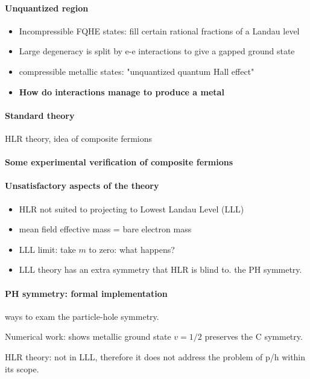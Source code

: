 \documentclass{article}
\numberwithin{equation}{subsection} %
\theoremstyle{definition}
\begin{document}
\paragraph{Unquantized region}

\begin{itemize}
    \item Incompressible FQHE states: fill certain rational fractions of a
        Landau level
    \item Large degeneracy is split by e-e interactions to give a gapped
        ground state
    \item compressible metallic states: "unquantized
        quantum Hall effect"
    \item \textbf{How do interactions manage to produce a metal}
\end{itemize}

\paragraph{Standard theory} HLR theory, idea of composite fermions

\paragraph{Some experimental verification of composite fermions}

\paragraph{Unsatisfactory aspects of the theory}
\begin{itemize}
    \item HLR not suited to projecting to Lowest Landau Level (LLL)
    \item mean field effective mass = bare electron mass
    \item LLL limit: take $m$ to zero: what happens?
    \item LLL theory has an extra symmetry that HLR is blind to. the PH
        symmetry.
\end{itemize}
\paragraph{PH symmetry: formal implementation} ways to exam the
particle-hole symmetry.

Numerical work: shows metallic ground state $v=1/2$ preserves the C
symmetry.

HLR theory: not in LLL, therefore it does not address the problem of p/h
within its scope.
\end{document}

